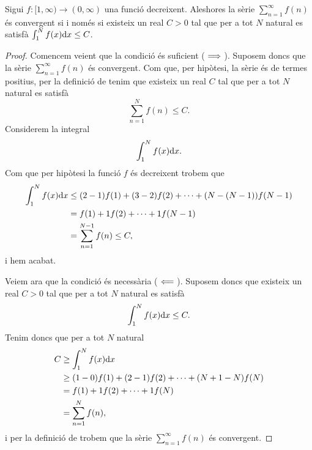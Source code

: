 \documentclass[../Apunts.tex]{subfiles}
\begin{document}
	\begin{lemma}
		\label{lema:criteri de la integral}
		Sigui \(f\colon[1,\infty)\longrightarrow(0,\infty)\) una funció decreixent. Aleshores la sèrie \(\sum_{n=1}^{\infty}f(n)\) és convergent si i només si existeix un real \(C>0\) tal que per a tot \(N\) natural es satisfà \(\int_{1}^{N}f(x)\mathrm{d} x\leq C\).
		\begin{proof}
			Comencem veient que la condició és suficient (\(\implies\)). Suposem doncs que la sèrie \(\sum_{n=1}^{\infty}f(n)\) és convergent. Com que, per hipòtesi, la sèrie és de termes positius, per la definició de  tenim que existeix un real \(C\) tal que per a tot \(N\) natural es satisfà
			\[\sum_{n=1}^{N}f(n)\leq C.\]
			Considerem la integral
			\[\int_{1}^{N}f(x)\mathrm{d} x.\]
			Com que per hipòtesi la funció \(f\) és decreixent trobem que
			\begin{align*}
				\int_{1}^{N}f(x)\mathrm{d} x&\leq(2-1)f(1)+(3-2)f(2)+\dots+(N-(N-1))f(N-1)\\
				&=f(1)+1f(2)+\dots+1f(N-1)\\
				&=\sum_{n=1}^{N-1}f(n)\leq C,
			\end{align*}
			i hem acabat.
			
			Veiem ara que la condició és necessària (\(\impliedby\)). Suposem doncs que existeix un real \(C>0\) tal que per a tot \(N\) natural es satisfà
			\[\int_{1}^{N}f(x)\mathrm{d} x\leq C.\]
			Tenim doncs que per a tot \(N\) natural
			\begin{align*}
				C&\geq\int_{1}^{N}f(x)\mathrm{d} x \\
				&\geq(1-0)f(1)+(2-1)f(2)+\dots+(N+1-N)f(N) \\
				&=f(1)+1f(2)+\dots+1f(N) \\
				&=\sum_{n=1}^{N}f(n),
			\end{align*}
			i per la definició de  trobem que la sèrie \(\sum_{n=1}^{\infty}f(n)\) és convergent.
		\end{proof}
	\end{lemma}
\end{document}
